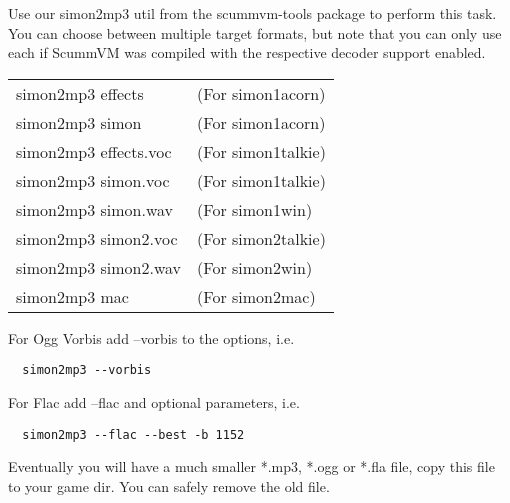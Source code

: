 Use our simon2mp3 util from the scummvm-tools package to perform this task.
You can choose between multiple target formats, but note that you can only use
each if ScummVM was compiled with the respective decoder support enabled.

\begin{tabular}[h]{ll}
  simon2mp3 effects    &(For simon1acorn)\\
  simon2mp3 simon      &(For simon1acorn)\\
  simon2mp3 effects.voc&(For simon1talkie)\\
  simon2mp3 simon.voc  &(For simon1talkie)\\
  simon2mp3 simon.wav  &(For simon1win)\\
  simon2mp3 simon2.voc &(For simon2talkie)\\
  simon2mp3 simon2.wav &(For simon2win)\\
  simon2mp3 mac        &(For simon2mac)\\
\end{tabular}

For Ogg Vorbis add --vorbis to the options, i.e.
\begin{verbatim}
  simon2mp3 --vorbis
\end{verbatim}
%
For Flac add --flac and optional parameters, i.e.
\begin{verbatim}
  simon2mp3 --flac --best -b 1152 
\end{verbatim}
%
Eventually you will have a much smaller *.mp3, *.ogg or *.fla file, copy this
file to your game dir. You can safely remove the old file.
